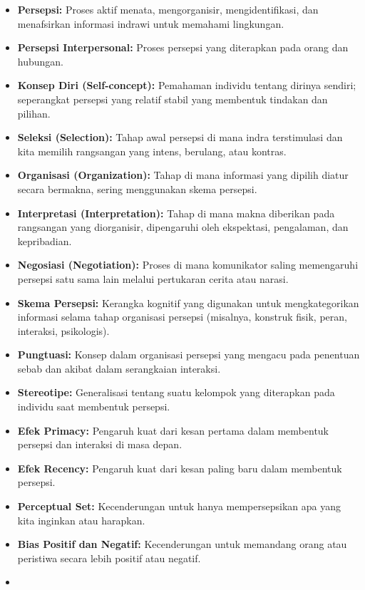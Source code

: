 \documentclass[
  letterpaper,
  DIV=11,
  numbers=noendperiod]{scrreprt}
\providecommand{\tightlist}{%
  \setlength{\itemsep}{0pt}\setlength{\parskip}{0pt}}
\begin{document}
\begin{itemize}
\tightlist
\item
  \textbf{Persepsi:} Proses aktif menata, mengorganisir,
  mengidentifikasi, dan menafsirkan informasi indrawi untuk memahami
  lingkungan.
\item
  \textbf{Persepsi Interpersonal:} Proses persepsi yang diterapkan pada
  orang dan hubungan.
\item
  \textbf{Konsep Diri (Self-concept):} Pemahaman individu tentang
  dirinya sendiri; seperangkat persepsi yang relatif stabil yang
  membentuk tindakan dan pilihan.
\item
  \textbf{Seleksi (Selection):} Tahap awal persepsi di mana indra
  terstimulasi dan kita memilih rangsangan yang intens, berulang, atau
  kontras.
\item
  \textbf{Organisasi (Organization):} Tahap di mana informasi yang
  dipilih diatur secara bermakna, sering menggunakan skema persepsi.
\item
  \textbf{Interpretasi (Interpretation):} Tahap di mana makna diberikan
  pada rangsangan yang diorganisir, dipengaruhi oleh ekspektasi,
  pengalaman, dan kepribadian.
\item
  \textbf{Negosiasi (Negotiation):} Proses di mana komunikator saling
  memengaruhi persepsi satu sama lain melalui pertukaran cerita atau
  narasi.
\item
  \textbf{Skema Persepsi:} Kerangka kognitif yang digunakan untuk
  mengkategorikan informasi selama tahap organisasi persepsi (misalnya,
  konstruk fisik, peran, interaksi, psikologis).
\item
  \textbf{Pungtuasi:} Konsep dalam organisasi persepsi yang mengacu pada
  penentuan sebab dan akibat dalam serangkaian interaksi.
\item
  \textbf{Stereotipe:} Generalisasi tentang suatu kelompok yang
  diterapkan pada individu saat membentuk persepsi.
\item
  \textbf{Efek Primacy:} Pengaruh kuat dari kesan pertama dalam
  membentuk persepsi dan interaksi di masa depan.
\item
  \textbf{Efek Recency:} Pengaruh kuat dari kesan paling baru dalam
  membentuk persepsi.
\item
  \textbf{Perceptual Set:} Kecenderungan untuk hanya mempersepsikan apa
  yang kita inginkan atau harapkan.
\item
  \textbf{Bias Positif dan Negatif:} Kecenderungan untuk memandang orang
  atau peristiwa secara lebih positif atau negatif.
\item

\end{itemize}
\end{document}
